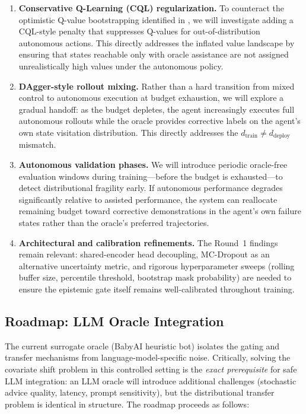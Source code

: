 \documentclass[11pt, a4paper]{article}
\begin{document}
\begin{enumerate}[leftmargin=*, label=(\roman*)]
    \item \textbf{Conservative Q-Learning (CQL) regularization.} To counteract the optimistic Q-value bootstrapping identified in , we will investigate adding a CQL-style penalty that suppresses Q-values for out-of-distribution autonomous actions. This directly addresses the inflated value landscape by ensuring that states reachable only with oracle assistance are not assigned unrealistically high values under the autonomous policy.

    \item \textbf{DAgger-style rollout mixing.} Rather than a hard transition from mixed control to autonomous execution at budget exhaustion, we will explore a gradual handoff: as the budget depletes, the agent increasingly executes full autonomous rollouts while the oracle provides corrective labels on the agent's own state visitation distribution. This directly addresses the $d_{\mathrm{train}} \neq d_{\mathrm{deploy}}$ mismatch.

    \item \textbf{Autonomous validation phases.} We will introduce periodic oracle-free evaluation windows during training---before the budget is exhausted---to detect distributional fragility early. If autonomous performance degrades significantly relative to assisted performance, the system can reallocate remaining budget toward corrective demonstrations in the agent's own failure states rather than the oracle's preferred trajectories.

    \item \textbf{Architectural and calibration refinements.} The Round~1 findings remain relevant: shared-encoder head decoupling, MC-Dropout as an alternative uncertainty metric, and rigorous hyperparameter sweeps (rolling buffer size, percentile threshold, bootstrap mask probability) are needed to ensure the epistemic gate itself remains well-calibrated throughout training.
\end{enumerate}

\subsection{Roadmap: LLM Oracle Integration}

The current surrogate oracle (BabyAI heuristic bot) isolates the gating and transfer mechanisms from language-model-specific noise. Critically, solving the covariate shift problem in this controlled setting is the \textit{exact prerequisite} for safe LLM integration: an LLM oracle will introduce additional challenges (stochastic advice quality, latency, prompt sensitivity), but the distributional transfer problem is identical in structure. The roadmap proceeds as follows:
\end{document}
